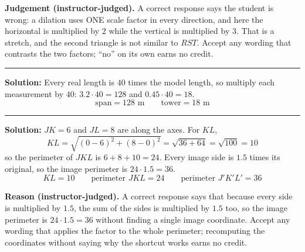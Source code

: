 \documentclass[12pt]{article}
\begin{document}
\textbf{Judgement (instructor-judged).} A correct response says the student is wrong: a dilation
uses ONE scale factor in every direction, and here the horizontal is multiplied by $2$ while the
vertical is multiplied by $3$. That is a stretch, and the second triangle is not similar to
$RST$. Accept any wording that contrasts the two factors; ``no'' on its own earns no credit.

\vspace{0.25cm}

\noindent\rule{\linewidth}{0.2pt}


\textbf{Solution:} \quad Every real length is $40$ times the model length, so multiply each
measurement by $40$: $3.2 \cdot 40 = 128$ and $0.45 \cdot 40 = 18$.
\[ \boxed{\text{span} = 128 \text{ m} \qquad \text{tower} = 18 \text{ m}} \]

\vspace{0.25cm}

\noindent\rule{\linewidth}{0.2pt}


\textbf{Solution:} \quad $JK = 6$ and $JL = 8$ are along the axes. For $KL$,
\[ KL = \sqrt{(0-6)^2 + (8-0)^2} = \sqrt{36 + 64} = \sqrt{100} = 10 \]
so the perimeter of $JKL$ is $6 + 8 + 10 = 24$. Every image side is $1.5$ times its original, so
the image perimeter is $24 \cdot 1.5 = 36$.
\[ \boxed{KL = 10 \qquad \text{perimeter } JKL = 24 \qquad \text{perimeter } J'K'L' = 36} \]

\textbf{Reason (instructor-judged).} A correct response says that because every side is
multiplied by $1.5$, the sum of the sides is multiplied by $1.5$ too, so the image perimeter is
$24 \cdot 1.5 = 36$ without finding a single image coordinate. Accept any wording that applies
the factor to the whole perimeter; recomputing the coordinates without saying why the shortcut
works earns no credit.
\end{document}
